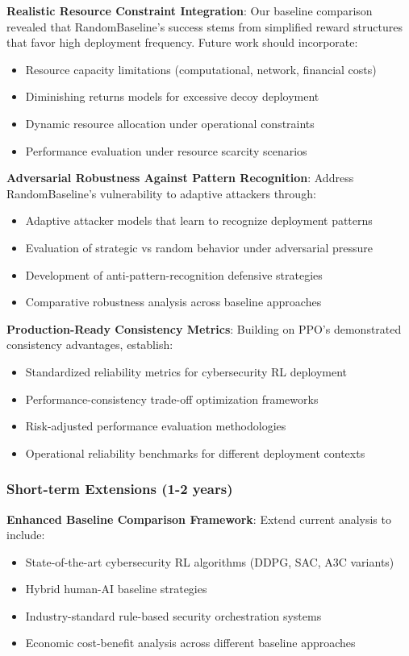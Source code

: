 \documentclass[12pt,twoside]{article}
\begin{document}
\textbf{Realistic Resource Constraint Integration}: Our baseline comparison revealed that RandomBaseline's success stems from simplified reward structures that favor high deployment frequency. Future work should incorporate:
\begin{itemize}
\item Resource capacity limitations (computational, network, financial costs)
\item Diminishing returns models for excessive decoy deployment
\item Dynamic resource allocation under operational constraints
\item Performance evaluation under resource scarcity scenarios
\end{itemize}

\textbf{Adversarial Robustness Against Pattern Recognition}: Address RandomBaseline's vulnerability to adaptive attackers through:
\begin{itemize}
\item Adaptive attacker models that learn to recognize deployment patterns
\item Evaluation of strategic vs random behavior under adversarial pressure
\item Development of anti-pattern-recognition defensive strategies
\item Comparative robustness analysis across baseline approaches
\end{itemize}

\textbf{Production-Ready Consistency Metrics}: Building on PPO's demonstrated consistency advantages, establish:
\begin{itemize}
\item Standardized reliability metrics for cybersecurity RL deployment
\item Performance-consistency trade-off optimization frameworks
\item Risk-adjusted performance evaluation methodologies
\item Operational reliability benchmarks for different deployment contexts
\end{itemize}

\subsubsection{Short-term Extensions (1-2 years)}

\textbf{Enhanced Baseline Comparison Framework}: Extend current analysis to include:
\begin{itemize}
\item State-of-the-art cybersecurity RL algorithms (DDPG, SAC, A3C variants)
\item Hybrid human-AI baseline strategies
\item Industry-standard rule-based security orchestration systems
\item Economic cost-benefit analysis across different baseline approaches
\end{itemize}
\end{document}
